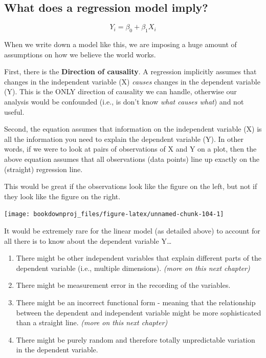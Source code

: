 \documentclass[
]{book}
\begin{document}
\hypertarget{what-does-a-regression-model-imply}{%
\subsection{What does a regression model imply?}\label{what-does-a-regression-model-imply}}

\[Y_i=\beta_0+\beta_1X_i\]

When we write down a model like this, we are imposing a huge amount of assumptions on how we believe the world works.

First, there is the \textbf{Direction of causality}. A regression implicitly assumes that changes in the independent variable (X) \emph{causes} changes in the dependent variable (Y). This is the ONLY direction of causality we can handle, otherwise our analysis would be confounded (i.e., is don't know \emph{what causes what}) and not useful.

Second, the equation assumes that information on the independent variable (X) is all the information you need to explain the dependent variable (Y). In other words, if we were to look at pairs of observations of X and Y on a plot, then the above equation assumes that all observations (data points) line up exactly on the (straight) regression line.

This would be great if the observations look like the figure on the left, but not if they look like the figure on the right.

\begin{center}\texttt{[image: bookdownproj\_files/figure-latex/unnamed-chunk-104-1]} \end{center}

It would be extremely rare for the linear model (as detailed above) to account for all there is to know about the dependent variable Y\ldots{}

\begin{enumerate}
\def\labelenumi{\arabic{enumi}.}
\item
  There might be other independent variables that explain different parts of the dependent variable (i.e., multiple dimensions). \emph{(more on this next chapter)}
\item
  There might be measurement error in the recording of the variables.
\item
  There might be an incorrect functional form - meaning that the relationship between the dependent and independent variable might be more sophisticated than a straight line. \emph{(more on this next chapter)}
\item
  There might be purely random and therefore totally unpredictable variation in the dependent variable.
\end{enumerate}
\end{document}
